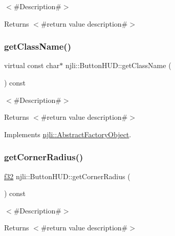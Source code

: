 $<$\#\+Description\#$>$

\begin{DoxyReturn}{Returns}
$<$\#return value description\#$>$ 
\end{DoxyReturn}
\mbox{\label{classnjli_1_1_button_h_u_d_aedbe9f0c1dea6d31dd13ff9e7e7e2b08}} 
\subsubsection{\texorpdfstring{get\+Class\+Name()}{getClassName()}}
{\footnotesize\ttfamily virtual const char$\ast$ njli\+::\+Button\+H\+U\+D\+::get\+Class\+Name (\begin{DoxyParamCaption}{ }\end{DoxyParamCaption}) const\hspace{0.3cm}{\ttfamily [virtual]}}

$<$\#\+Description\#$>$

\begin{DoxyReturn}{Returns}
$<$\#return value description\#$>$ 
\end{DoxyReturn}


Implements \mbox{\hyperlink{classnjli_1_1_abstract_factory_object_af4151e41b80d5bc3fc42822c67fc2278}{njli\+::\+Abstract\+Factory\+Object}}.

\mbox{\label{classnjli_1_1_button_h_u_d_a378f76c76951ad2d48df16ef43971ed2}} 
\subsubsection{\texorpdfstring{get\+Corner\+Radius()}{getCornerRadius()}}
{\footnotesize\ttfamily \mbox{\hyperlink{_util_8h_a5f6906312a689f27d70e9d086649d3fd}{f32}} njli\+::\+Button\+H\+U\+D\+::get\+Corner\+Radius (\begin{DoxyParamCaption}{ }\end{DoxyParamCaption}) const}

$<$\#\+Description\#$>$

\begin{DoxyReturn}{Returns}
$<$\#return value description\#$>$ 
\end{DoxyReturn}
\mbox{\label{classnjli_1_1_button_h_u_d_a5b0987df2a6b670226c12dc364d6e3a3}} 
